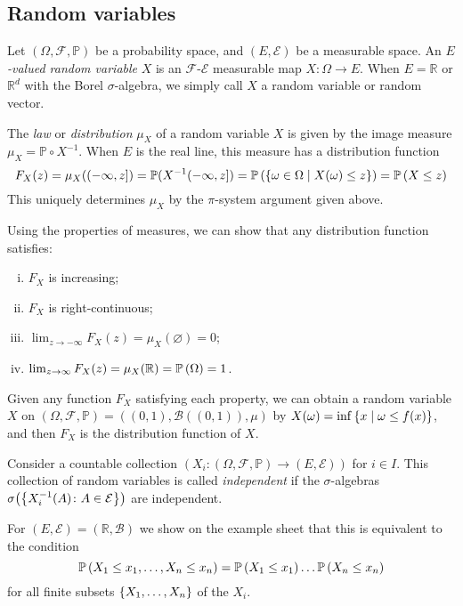 \subsection{Random variables}
\begin{definition}
	Let \( (\Omega, \mathcal F, \mathbb P) \) be a probability space, and \( (E, \mathcal E) \) be a measurable space.
	An \emph{\( E \)-valued random variable} \( X \) is an \( \mathcal F \)-\( \mathcal E \) measurable map \( X \colon \Omega \to E \).
	When \( E = \mathbb R \) or \( \mathbb R^d \) with the Borel \( \sigma \)-algebra, we simply call \( X \) a random variable or random vector.

	The \emph{law} or \emph{distribution} \( \mu_X \) of a random variable \( X \) is given by the image measure \( \mu_X = \mathbb P \circ X^{-1} \).
	When \( E \) is the real line, this measure has a distribution function
	\[ F_X(z) = \mu_X((-\infty, z]) = \mathbb P(X^{-1}(-\infty,z]) = \mathbb{P}\left({\qty{\omega \in \Omega \mid X(\omega) \leq z}}\right) = \mathbb{P}\left({X \leq z}\right) \]
	This uniquely determines \( \mu_X \) by the \( \pi \)-system argument given above.
\end{definition}
Using the properties of measures, we can show that any distribution function satisfies:
\begin{enumerate}[(i)]
	\item \( F_X \) is increasing;
	\item \( F_X \) is right-continuous;
	\item \( \lim_{z \to -\infty} F_X(z) = \mu_X(\varnothing) = 0 \);
	\item \( \lim_{z \to \infty} F_X(z) = \mu_X(\mathbb R) = \mathbb{P}\left({\Omega}\right) = 1 \).
\end{enumerate}
Given any function \( F_X \) satisfying each property, we can obtain a random variable \( X \) on \( (\Omega, \mathcal F, \mathbb P) = ((0,1), \mathcal B((0,1)), \mu) \) by \( X(\omega) = \inf\qty{x \mid \omega \leq f(x)} \), and then \( F_X \) is the distribution function of \( X \).
\begin{definition}
	Consider a countable collection \( (X_i \colon (\Omega, \mathcal F, \mathbb P) \to (E, \mathcal E)) \) for \( i \in I \).
	This collection of random variables is called \emph{independent} if the \( \sigma \)-algebras \( \sigma\qty(\qty{X_i^{-1}(A) \colon A \in \mathcal E}) \) are independent.
\end{definition}
For \( (E, \mathcal E) = (\mathbb R, \mathcal B) \) we show on the example sheet that this is equivalent to the condition
\[ \mathbb{P}\left({X_1 \leq x_1, \dots, X_n \leq x_n}\right) = \mathbb{P}\left({X_1 \leq x_1}\right) \dots \mathbb{P}\left({X_n \leq x_n}\right) \]
for all finite subsets \( \qty{X_1, \dots, X_n} \) of the \( X_i \).

